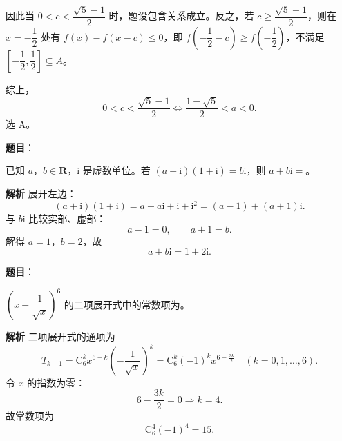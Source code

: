 \begin{answer}
因此当 $0<c<\dfrac{\sqrt5-1}{2}$ 时，题设包含关系成立。反之，若 $c\geqslant\dfrac{\sqrt5-1}{2}$，则在 $x=-\dfrac12$ 处有 $f(x)-f(x-c)\leqslant0$，即 $f\left(-\dfrac12-c\right)\geqslant f\left(-\dfrac12\right)$，不满足 $\left[-\dfrac12,\dfrac12\right]\subseteq A$。

综上，
\nopagebreak[4]
\[0<c<\frac{\sqrt5-1}{2}
\Longleftrightarrow
\frac{1-\sqrt5}{2}<a<0.\]
选 A。


\end{answer}
\begin{answer}

\textbf{题目}：

已知 $a$，$b\in\mathbf{R}$，$\mathrm i$ 是虚数单位。若 $(a+\mathrm i)(1+\mathrm i)=b\mathrm i$，则 $a+b\mathrm i=$\gkblank{}。

\textbf{解析}
展开左边：
\nopagebreak[4]
\[(a+\mathrm i)(1+\mathrm i)=a+a\mathrm i+\mathrm i+\mathrm i^2
=(a-1)+(a+1)\mathrm i.\]
与 $b\mathrm i$ 比较实部、虚部：
\nopagebreak[4]
\[a-1=0,\qquad a+1=b.\]
解得 $a=1$，$b=2$，故
\nopagebreak[4]
\[a+b\mathrm i=1+2\mathrm i.\]


\end{answer}
\begin{answer}

\textbf{题目}：

$\left(x-\dfrac{1}{\sqrt{x}}\right)^6$ 的二项展开式中的常数项为\gkblank{}。

\textbf{解析}
二项展开式的通项为
\nopagebreak[4]
\[T_{k+1}=\mathrm C_6^k x^{6-k}\left(-\frac1{\sqrt x}\right)^k
=\mathrm C_6^k(-1)^k x^{6-\frac{3k}{2}}\quad(k=0,1,\dots,6).\]
令 $x$ 的指数为零：
\nopagebreak[4]
\[6-\frac{3k}{2}=0\Longrightarrow k=4.\]
故常数项为
\nopagebreak[4]
\[\mathrm C_6^4(-1)^4=15.\]


\end{answer}
